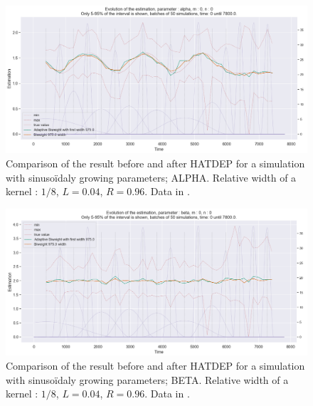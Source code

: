 \begin{figure}
\centering
\includegraphics[width = 0.90 \textwidth]{../imag/chap3/4_bis/P.png}
\caption{Comparison of the result before and after HATDEP for a simulation with sinusoïdaly growing parameters; ALPHA. Relative width of a kernel : $1/8$, $L = 0.04$, $R = 0.96$. Data in \protect {}.}
\label{fig:second_estimate_4_alpha}
\end{figure}

\begin{figure}
\centering
\includegraphics[width = 0.90 \textwidth]{../imag/chap3/4_bis/Q.png}
\caption{Comparison of the result before and after HATDEP for a simulation with sinusoïdaly growing parameters; BETA. Relative width of a kernel : $1/8$, $L = 0.04$, $R = 0.96$. Data in \protect {}.}
\label{fig:second_estimate_4_beta}
\end{figure}

